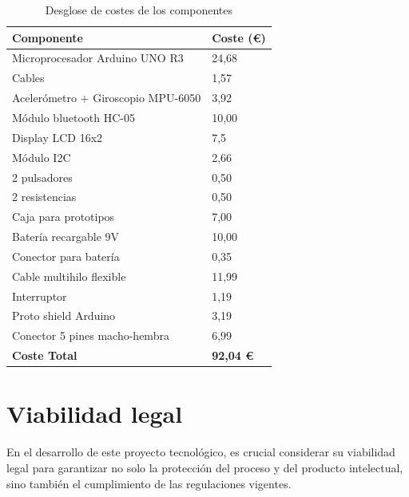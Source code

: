 \begin{table}[]
    \centering
    \begin{tabular}{ll}
        \hline
        \rowcolor[HTML]{FFFFFF} 
        \textbf{Componente} & \textbf{Coste (€)} \\ \hline
        \rowcolor[HTML]{EFEFEF} 
        Microprocesador Arduino UNO R3 & 24,68 \\ \hline
        \rowcolor[HTML]{FFFFFF} 
        Cables & 1,57 \\ \hline
        \rowcolor[HTML]{EFEFEF} 
        Acelerómetro + Giroscopio MPU-6050 & 3,92 \\ \hline
        \rowcolor[HTML]{FFFFFF} 
        Módulo bluetooth HC-05 & 10,00 \\ \hline
        \rowcolor[HTML]{EFEFEF} 
        Display LCD 16x2 & 7,5 \\ \hline
        \rowcolor[HTML]{FFFFFF} 
        Módulo I2C & 2,66 \\ \hline
        \rowcolor[HTML]{EFEFEF} 
        2 pulsadores & 0,50 \\ \hline
        \rowcolor[HTML]{FFFFFF} 
        2 resistencias & 0,50 \\ \hline
        \rowcolor[HTML]{EFEFEF} 
        Caja para prototipos & 7,00 \\ \hline
        \rowcolor[HTML]{FFFFFF} 
        Batería recargable 9V & 10,00 \\ \hline
        \rowcolor[HTML]{EFEFEF} 
        Conector para batería & 0,35 \\ \hline
        \rowcolor[HTML]{FFFFFF} 
        Cable multihilo flexible & 11,99 \\ \hline
        \rowcolor[HTML]{EFEFEF} 
        Interruptor & 1,19 \\ \hline
        \rowcolor[HTML]{FFFFFF} 
        Proto shield Arduino & 3,19 \\ \hline
        \rowcolor[HTML]{EFEFEF} 
        Conector 5 pines macho-hembra & 6,99 \\ \hline
        \rowcolor[HTML]{C0C0C0} 
        \textbf{Coste Total} & \textbf{92,04 €} \\ \hline
    \end{tabular}
    \caption{Desglose de costes de los componentes}
    \label{tab:costesComponentes}
\end{table}


\section{Viabilidad legal}
En el desarrollo de este proyecto tecnológico, es crucial considerar su viabilidad legal para garantizar no solo la protección del proceso y del producto intelectual, sino también el cumplimiento de las regulaciones vigentes.

